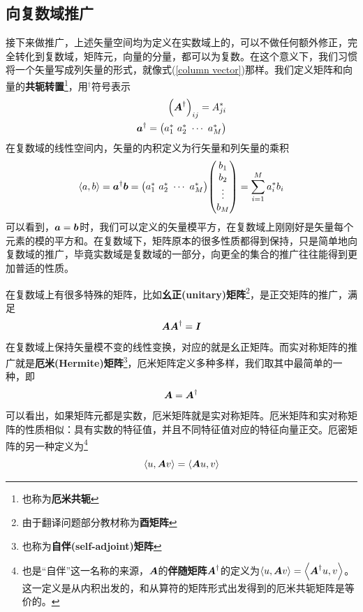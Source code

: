 \documentclass[12pt,a4paper,openany,twoside]{book}
\numberwithin{equation}{section}
\newcommand{\mean}[1]{\left\langle #1 \right\rangle}
\begin{document}
        \subsection{向复数域推广}
          \label{expansion_to_complex_field}
          接下来做推广，上述矢量空间均为定义在实数域上的，可以不做任何额外修正，完全转化到复数域，矩阵元，向量的分量，都可以为复数。在这个意义下，我们习惯将一个矢量写成列矢量的形式，就像式(\ref{column vector})那样。我们定义矩阵和向量的\textbf{共轭转置}\footnote{也称为\textbf{厄米共轭}}，用$^\dagger$符号表示
          \begin{equation}
            \begin{aligned}
              \qty(\vb*{A}^\dagger)_{i j}=A_{j i}^* \\
              \vb*{a}^\dagger=\mqty(a_1^*\ a_2^*\ \cdots\ a_M^*)
            \end{aligned}
          \end{equation}
          在复数域的线性空间内，矢量的内积定义为行矢量和列矢量的乘积
          \begin{equation}
            \mean{a,b}=\vb*{a}^\dagger\vb*{b}=\mqty(a_1^*\ a_2^*\ \cdots\ a_M^*) \mqty(
              b_1 \\
              b_2 \\
              \vdots \\
              b_M
            )=\sum_{i=1}^M{a_i^* b_i}
            \label{inner product in row and column }
          \end{equation}
          可以看到，$\vb*{a}=\vb*{b}$时，我们可以定义的矢量模平方，在复数域上刚刚好是矢量每个元素的模的平方和。在复数域下，矩阵原本的很多性质都得到保持，只是简单地向复数域的推广，毕竟实数域是复数域的一部分，向更全的集合的推广往往能得到更加普适的性质。

          在复数域上有很多特殊的矩阵，比如\textbf{幺正(unitary)矩阵}\footnote{由于翻译问题部分教材称为\textbf{酉矩阵}}，是正交矩阵的推广，满足
          \begin{equation}
            \vb*{A}\vb*{A}^\dagger=\vb*{I}
            \label{unitary def}
          \end{equation}
          在复数域上保持矢量模不变的线性变换，对应的就是幺正矩阵。而实对称矩阵的推广就是\textbf{厄米(Hermite)矩阵}\footnote{也称为\textbf{自伴(self-adjoint)矩阵}}，厄米矩阵定义多种多样，我们取其中最简单的一种，即
          \begin{equation}
            \vb*{A}=\vb*{A}^{\dagger}
          \end{equation}
          可以看出，如果矩阵元都是实数，厄米矩阵就是实对称矩阵。厄米矩阵和实对称矩阵的性质相似：具有实数的特征值，并且不同特征值对应的特征向量正交。厄密矩阵的另一种定义为\footnote{也是“自伴”这一名称的来源，$\vb*{A}$的\textbf{伴随矩阵}$\vb*{A}^\dagger$的定义为$\mean{u,\vb*{A}v}=\mean{\vb*{A}^\dagger u,v}$。这一定义是从内积出发的，和从算符的矩阵形式出发得到的厄米共轭矩阵是等价的。}
          \begin{equation}
            \mean{u,\vb*{A}v}=\mean{\vb*{A}u,v}
          \end{equation}
\end{document}
